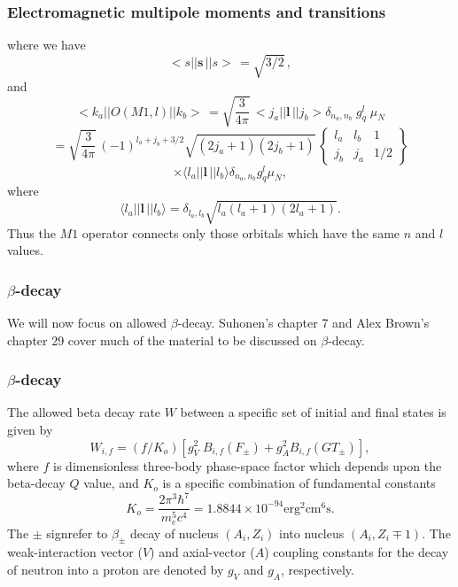 \documentclass{beamer}
\begin{document}
\begin{frame}
\frametitle{Electromagnetic multipole moments and transitions}

\begin{block}{}
where we have
\[
<s\vert\vert \mathbf{s}\,\vert\vert s>\, = \sqrt{3/2}\, ,
\]
and
\[
<k_{a}\vert\vert O(M1,l )\vert\vert k_{b}>\, =
\sqrt{ \frac{3}{4\pi }}\,
<j_{a}\vert\vert \mathbf{l}\,\vert\vert j_{b}> \delta _{n_{a},n_{b}} \; g^{l }_{q} \; \mu _{N}
\]
\[
=\sqrt{ \frac{3}{4\pi }}\,
(-1)^{l _{a}+j_{b}+3/2} \sqrt{(2j_{a}+1)(2j_{b}+1)}\,
   \left\{\begin{array}{ccc}  {l _{a}}&  {l _{b}} & {1}\\  {j_{b}}&  {j_{a}}&  {1/2}\end{array}\right\}
\]
\[
\times\langle l _{a}\vert\vert \mathbf{l}\,\vert\vert l _{b}\rangle \delta _{n_{a},n_{b}}g^{l }_{q}\mu _{N} ,       
\]
where
\[
\langle l _{a}\vert\vert \mathbf{l}\,\vert\vert l _{b}\rangle = \delta _{l _{a},l _{b}} \sqrt{l _{a}(l_{a}+1)(2l _{a}+1)}.
\]
Thus the $M1$ operator connects only
those orbitals which have the same $n$ and $l$ values.
\end{block}
\end{frame}

\begin{frame}
\frametitle{$\beta$-decay}

\begin{block}{}
We will now focus on  allowed $\beta$-decay.  
Suhonen's chapter 7 and Alex Brown's chapter 29 cover much of the material to be discussed on $\beta$-decay. 
\end{block}
\end{frame}

\begin{frame}
\frametitle{$\beta$-decay}

\begin{block}{}
The allowed beta decay rate $W$ between a specific set of
initial and final states is given by
\[
W_{i,f} = (f/K_{o}) \left[ g_{V}^{2} \; B_{i,f}(F_{\pm})+ g_{A}^{2}B_{i,f}(GT_{\pm})\right], 
\]
where $f$ is dimensionless three-body
phase-space factor which depends upon the
beta-decay $Q$ value,
and $K_{o}$ is a specific combination of fundamental constants
\[
  K_{o}=\frac{2\pi^{3}\hbar^{7}}{ m_{e}^{5} c^{4}}= 1.8844 \times 10^{-94}\mathrm{erg}^{2}\mathrm{cm}^{6}\mathrm{s}. 
\]
The $\pm$ signrefer to $\beta_{\pm}$ decay of nucleus
$(A_{i},Z_{i})$ into nucleus $(A_{i},Z_{i} \mp 1)  $.
The weak-interaction vector ($V$) and axial-vector ($A$) coupling
constants for the decay of neutron into a proton are denoted by $g_{V}$
and $g_{A}$, respectively.
\end{block}
\end{frame}
\end{document}
